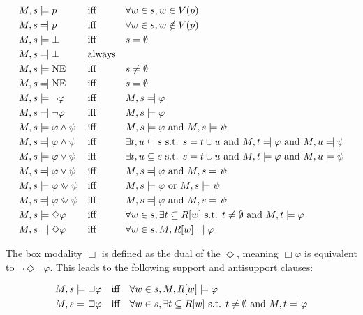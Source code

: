 \begin{alignat*}{3}
& M, s \models p \quad && \text{iff} \quad &&\forall w \in s, w \in V(p) \\
&M, s \leftmodels p  && \text{iff}  && \forall w \in s, w \notin V(p) \\
&M, s \models \bot  && \text{iff}  && s = \emptyset \\
&M, s \leftmodels \bot  && \text{always} \\
&M, s \models \text{NE}  && \text{iff} && s \neq \emptyset \\
&M, s \leftmodels  \text{NE}  && \text{iff} && s = \emptyset \\
&M, s \models \neg \varphi  && \text{iff} && M, s \leftmodels \varphi \\
&M, s \leftmodels  \neg \varphi  && \text{iff} && M, s \models \varphi \\
&M, s \models \varphi \land \psi  && \text{iff} && M, s \models \varphi \text{ and } M, s \models \psi \\
&M, s \leftmodels  \varphi \land \psi  && \text{iff} && \exists t, u \subseteq s \text{ s.t. } s = t \cup u \text{ and } M, t \leftmodels \varphi \text{ and } M, u \leftmodels \psi \\
&M, s \models \varphi \lor \psi  && \text{iff} && \exists t, u \subseteq s \text{ s.t. } s = t \cup u \text{ and } M, t \models \varphi \text{ and } M, u \models \psi \\
&M, s \leftmodels \varphi \lor \psi  && \text{iff} && M, s \leftmodels \varphi \text{ and } M, s \leftmodels \psi \\
&M, s \models \varphi \inqdisj \psi  && \text{iff} && M, s \models \varphi \text{ or } M, s \models \psi \\
&M, s \leftmodels \varphi \inqdisj \psi  && \text{iff} &&  M, s \leftmodels\varphi \text{ and } M, s \leftmodels \psi\\
&M, s \models \Diamond \varphi  && \text{iff} &&  \forall w \in s, \exists t \subseteq R[w] \text{ s.t. } t \neq \emptyset \text{ and } M, t \models \varphi \\
&M, s \leftmodels  \Diamond \varphi && \text{iff} && \forall w \in s, M, R[w] \leftmodels \varphi
\end{alignat*}

The box modality \(\Box\) is defined as the dual of the \(\Diamond\), meaning \(\Box \varphi\) is equivalent to \(\neg \Diamond \neg \varphi\). This leads to the following support and antisupport clauses:

\begin{align*}
M, s &\models \Box \varphi \quad \text{iff} \quad \forall w \in s, M, R[w] \models \varphi \\
M, s &\leftmodels  \Box \varphi \quad \text{iff} \quad  \forall w \in s, \exists t \subseteq R[w] \text{ s.t. } t \neq \emptyset \text{ and } M, t \leftmodels \varphi 
\end{align*}


